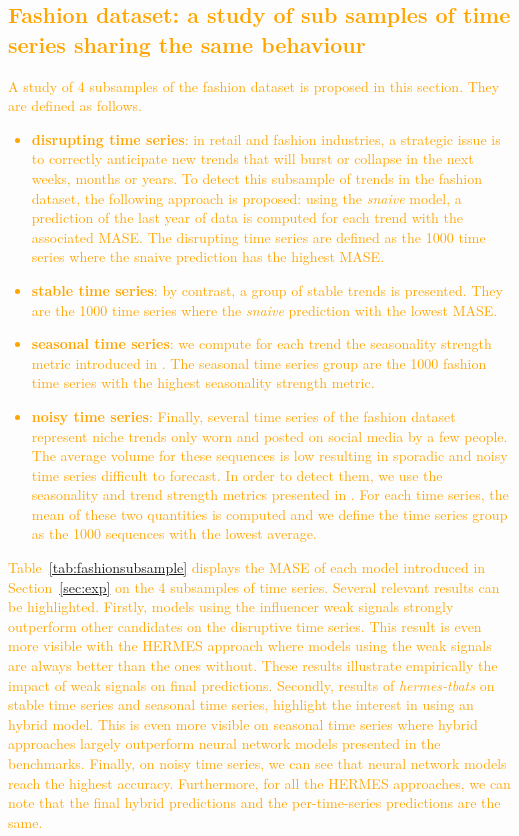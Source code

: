 \documentclass[10pt]{article} %
\begin{document}
\textcolor{orange}{
\section{Fashion dataset: a study of sub samples of time series sharing the same behaviour}
}
\textcolor{orange}{
A study of 4 subsamples of the fashion dataset is proposed in this section. They are defined as follows.
\begin{itemize}
\item \textbf{disrupting time series}: in retail and fashion industries, a strategic issue is to correctly anticipate new trends that will burst or collapse in the next weeks, months or years. To detect this subsample of trends in the fashion dataset, the following approach is proposed: using the \textit{snaive} model, a prediction of the last year of data is computed for each trend with the associated MASE. The disrupting time series are defined as the 1000 time series where the snaive prediction has  the highest MASE.
\item \textbf{stable time series}: by contrast, a group of stable trends is presented. They are the 1000 time series where the \textit{snaive} prediction with the lowest MASE. 
\item \textbf{seasonal time series}: we compute for each trend the seasonality strength metric introduced in \citet{wang2006}. The seasonal time series group are the 1000 fashion time series with the highest seasonality strength metric.
\item \textbf{noisy time series}: Finally, several time series of the fashion dataset represent niche trends only worn and posted on social media by a few people. The average volume for these sequences is low resulting in sporadic and noisy time series difficult to forecast. In order to detect them, we use the seasonality and trend strength metrics presented in \citet{wang2006}. For each time series, the mean of these two quantities is computed and we define the time series group as the 1000 sequences with the lowest average.
\end{itemize}
Table~\ref{tab:fashionsubsample} displays the MASE of each model introduced in Section~\ref{sec:exp} on the 4 subsamples of time series. Several relevant results can be highlighted. Firstly, models using the influencer weak signals strongly outperform other candidates on the disruptive time series. This result is even more visible with the HERMES approach where models using the weak signals are always better than the ones without. These results illustrate empirically the impact of weak signals on final predictions. Secondly, results of \textit{hermes-tbats} on stable time series and seasonal time series, highlight the interest in using an hybrid model. This  is even more visible on seasonal time series where hybrid approaches largely outperform neural network models presented in the benchmarks. Finally, on noisy time series, we can see that neural network models reach the highest accuracy. Furthermore, for all the HERMES approaches, we can note that the final hybrid predictions and the per-time-series predictions are the same.}
\end{document}
